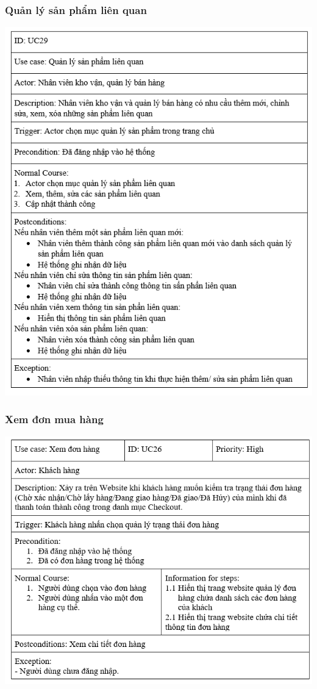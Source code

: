 \documentclass[12pt,a4paper,2sides]{report}
\begin{document}
\subsubsection{Quản lý sản phẩm liên quan}
    \includegraphics[width=1\linewidth]{lib/usecase/quanlysplienquan.png}\\\vspace*{1cm} 
\subsubsection{Xem đơn mua hàng}
    \includegraphics[width=1\linewidth]{lib/usecase/xemdonhang.png}\\\vspace*{1cm} 
\end{document}
